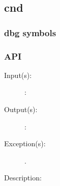 %
%
%
%
%              

\label{cnd}
\subsection{cnd}

\subsubsection{dbg symbols}

\subsubsection{API}
\begin{description}
\label{cnd_}
\item[{\cfunc[]{cnd\_}{}}: ]
	\begin{description}\item[]
	\item[Input(s): ]
		\begin{description}\item[]
		\item[: ]
		\end{description}
	\item[Output(s): ]
		\begin{description}\item[]
		\item[: ]
		\end{description}
	\item[Exception(s): ]
		\begin{description}\item[]
		\item[.]
		\end{description}
	\item[Description: ]
	\end{description}
\end{description}

